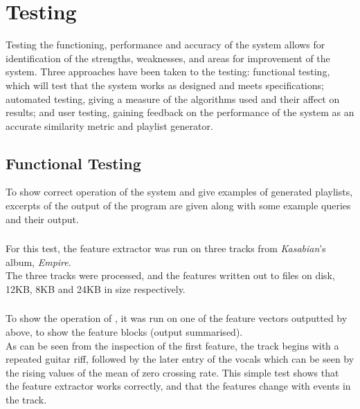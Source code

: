 \newcommand{\graph}[2]{
\begin{figure}[!hp]
	\caption{#2}
	\texttt{[image: testing/graphs/\#1]}
	\label{graph:#1}
\end{figure}}
\chapter{Testing}
\label{text:testing}
Testing the functioning, performance and accuracy of the system allows for identification of the strengths, weaknesses, and areas for improvement of the system. Three approaches have been taken to the testing: functional testing, which will test that the system works as designed and meets specifications; automated testing, giving a measure of the algorithms used and their affect on results; and user testing, gaining feedback on the performance of the system as an accurate similarity metric and playlist generator.
\section{Functional Testing}
\label{text:testing:functional}
To show correct operation of the system and give examples of generated playlists, excerpts of the output of the program are given along with some example queries and their output.
\subsection{}
For this test, the feature extractor was run on three tracks from \emph{Kasabian}'s album, \emph{Empire}.\\

The three tracks were processed, and the features written out to files on disk, 12KB, 8KB and 24KB in size respectively.
\subsection{}
To show the operation of , it was run on one of the feature vectors outputted by  above, to show the feature blocks (output summarised).\\

As can be seen from the inspection of the first feature, the track begins with a repeated guitar riff, followed by the later entry of the vocals which can be seen by the rising values of the mean of zero crossing rate. This simple test shows that the feature extractor works correctly, and that the features change with events in the track.
